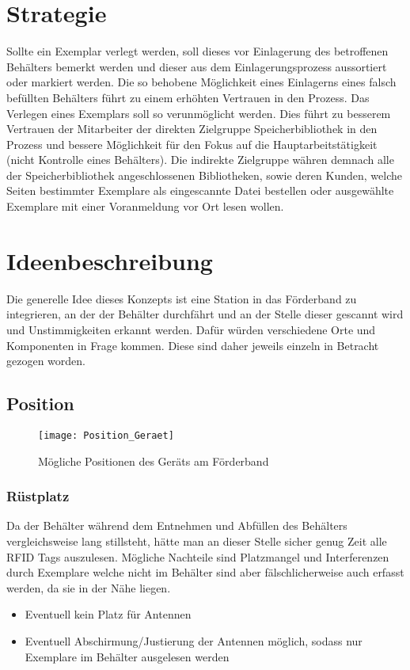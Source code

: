 \section{Strategie}
Sollte ein Exemplar verlegt werden, soll dieses vor Einlagerung des betroffenen Behälters bemerkt werden und dieser aus dem Einlagerungsprozess aussortiert oder markiert werden. Die so behobene Möglichkeit eines Einlagerns eines falsch befüllten Behälters führt zu einem erhöhten Vertrauen in den Prozess. Das Verlegen eines Exemplars soll so verunmöglicht werden. Dies führt zu besserem Vertrauen der Mitarbeiter der direkten Zielgruppe Speicherbibliothek in den Prozess und bessere Möglichkeit für den Fokus auf die Hauptarbeitstätigkeit (nicht Kontrolle eines Behälters). Die indirekte Zielgruppe währen demnach alle der Speicherbibliothek angeschlossenen Bibliotheken, sowie deren Kunden, welche Seiten bestimmter Exemplare als eingescannte Datei bestellen oder ausgewählte Exemplare mit einer Voranmeldung vor Ort lesen wollen.

\section{Ideenbeschreibung}

Die generelle Idee dieses Konzepts ist eine Station in das Förderband zu integrieren, an der der Behälter durchfährt und an der Stelle dieser gescannt wird und Unstimmigkeiten erkannt werden. Dafür würden verschiedene Orte und Komponenten in Frage kommen. Diese sind daher jeweils einzeln in Betracht gezogen worden.

\subsection{Position}

\begin{figure}
	\centering
	\texttt{[image: Position\_Geraet]}
	\caption{Mögliche Positionen des Geräts am Förderband}
\end{figure}

\subsubsection{Rüstplatz}
Da der Behälter während dem Entnehmen und Abfüllen des Behälters vergleichsweise lang stillsteht, hätte man an dieser Stelle sicher genug Zeit alle RFID Tags auszulesen. Mögliche Nachteile sind Platzmangel und Interferenzen durch Exemplare welche nicht im Behälter sind aber fälschlicherweise auch erfasst werden, da sie in der Nähe liegen.
\begin{itemize}
	\pro Genügend Zeit für das Auslesen aller Tags
	\pro Früh im Prozess für eine Meldung
	\con Interferenzen durch RFID markierte Exemplare in der Nähe
	\item Eventuell kein Platz für Antennen
	\item Eventuell Abschirmung/Justierung der Antennen möglich, sodass nur Exemplare im Behälter ausgelesen werden
\end{itemize}

